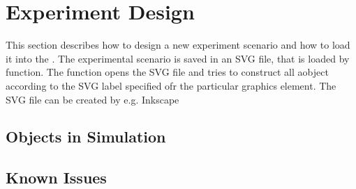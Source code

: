 \section{Experiment Design}

This section describes how to design a new experiment scenario and how to load it into the \vivae .
The experimental scenario is saved in an SVG \cite{FIXME} file, that is loaded by  function. The  function opens the SVG file and tries to construct all aobject according to the SVG label specified ofr the particular graphics element. The SVG file can be created by e.g. Inkscape \cite{FIXME}

\subsection{Objects in Simulation}

\subsection{Known Issues}
